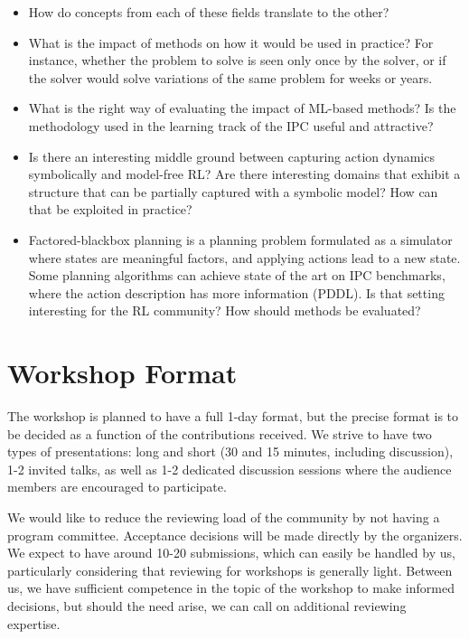 \documentclass[10pt]{article}
\begin{document}
\begin{itemize}
\item How do concepts from each of these fields translate to the other?
%
%
\item What is the impact of methods on how it would be used in practice? For
instance, whether the problem to solve is seen only once by the solver, or if
the solver would solve variations of the same problem for weeks or years. 
%
\item What is the right way of evaluating the impact of ML-based methods? Is the
methodology used in the learning track of the IPC useful and attractive?
%
\item Is there an interesting middle ground between capturing action dynamics
symbolically and model-free RL? Are there interesting domains that exhibit a
structure that can be partially captured with a symbolic model? How can that be
exploited in practice?
%
\item Factored-blackbox planning is a planning problem formulated as a simulator
where states are meaningful factors, and applying actions lead to a new state.
Some planning algorithms can achieve state of the art on IPC benchmarks, where
the action description has more information (PDDL). Is that setting interesting
for the RL community? How should methods be evaluated?
\end{itemize}

\section*{Workshop Format}

The workshop is planned to have a full 1-day format, but the precise format is
to be decided as a function of the contributions received. We strive to have two
types of presentations: long and short (30 and 15 minutes, including
discussion), 1-2 invited talks, as well as 1-2 dedicated discussion sessions
where the audience members are encouraged to participate.

We would like to reduce the reviewing load of the community by not having a
program committee. Acceptance decisions will be made directly by the organizers.
We expect to have around 10-20 submissions, which can easily be handled by us,
particularly considering that reviewing for workshops is generally light.
Between us, we have sufficient competence in the topic of the workshop to make
informed decisions, but should the need arise, we can call on additional
reviewing expertise.
\end{document}
